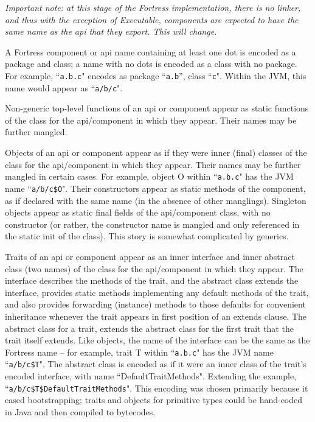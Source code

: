 \documentclass[11pt]{article}
\begin{document}
{\it Important note: at this stage of the Fortress implementation, there is no linker, and thus with the exception of Executable, components are expected to have the same name as the api that they export.  This will change.}

A Fortress component or api name containing at least one dot is encoded as a package and class; a name with no dots is encoded as a class with no package.  For example, ``\verb+a.b.c+" encodes as package ``\verb+a.b+'', class ``\verb+c+".  Within the JVM, this name would appear as ``\verb+a/b/c+".

Non-generic top-level functions of an api or component appear as static functions of the class for the api/component in which they appear.  Their names may be further mangled.

Objects of an api or component appear as if they were inner (final) classes of the class for the api/component in which they appear.  Their names may be further mangled in certain cases.  For example, object O within ``\verb+a.b.c+" has the JVM name ``\verb+a/b/c$O+".  Their constructors appear as static methods of the component, as if declared with the same name (in the absence of other manglings).  Singleton objects appear as static final fields of the api/component class, with no constructor (or rather, the constructor name is mangled and only referenced in the static init of the class).  This story is somewhat complicated by generics.

Traits of an api or component appear as an inner interface and inner abstract class (two names) of the class for the api/component in which they appear.  The interface describes the methods of the trait, and the abstract class extends the interface, provides static methods implementing any default methods of the trait, and also provides forwarding (instance) methods to those defaults for convenient inheritance whenever the trait appears in first position of an extends clause.  The abstract class for a trait, extends the abstract class for the first trait that the trait itself extends.  Like objects, the name of the interface can be the same as the Fortress name -- for example, trait T within ``\verb+a.b.c+" has the JVM name ``\verb+a/b/c$T+".  The abstract class is encoded as if it were an inner class of the trait's encoded interface, with name ``DefaultTraitMethods".  Extending the example, ``\verb+a/b/c$T$DefaultTraitMethods+".  This encoding was chosen primarily because it eased bootstrapping; traits and objects for primitive types could be hand-coded in Java and then compiled to bytecodes.
\end{document}
